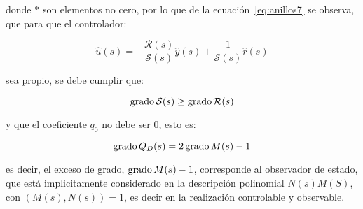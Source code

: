         donde $*$ son elementos no cero, por lo que de la ecuación~\ref{eq:anillos7} se observa, que para que el controlador:

        \begin{equation*}
            \hat{u}(s) = - \frac{\mathcal{R}(s)}{\mathcal{S}(s)} \hat{y}(s) + \frac{1}{\mathcal{S}(s)} \hat{r}(s)
        \end{equation*}

        sea propio, se debe cumplir que:

        \begin{equation*}
            \operatorname{grado}{\mathcal{S}}(s) \ge \operatorname{grado}{\mathcal{R}}(s)
        \end{equation*}

        y que el coeficiente $q_0$ no debe ser $0$, esto es:

        \begin{equation*}
            \operatorname{grado}{Q_D(s)} = 2 \operatorname{grado}{M(s)} - 1
        \end{equation*}

        es decir, el exceso de grado, $\operatorname{grado}{M(s)} - 1$, corresponde al observador de estado, que está implicitamente considerado en la descripción polinomial $N(s) M(S)$, con $(M(s), N(s)) = 1$, es decir en la realización controlable y observable.
